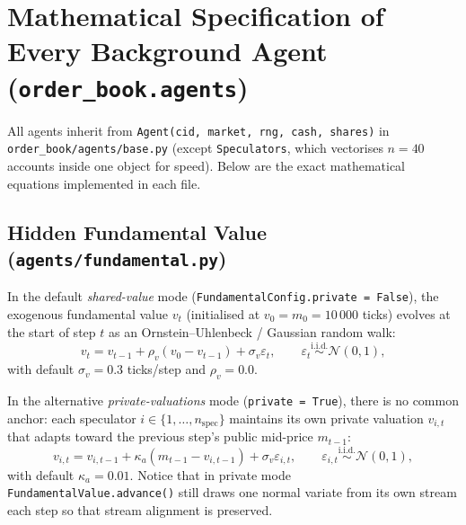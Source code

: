 \documentclass[11pt,a4paper]{article}
\newcommand{\code}[1]{\texttt{#1}}
\begin{document}
\section{Mathematical Specification of Every Background Agent (\code{order\_book.agents})}
\label{sec:agents}

All agents inherit from \code{Agent(cid, market, rng, cash, shares)} in \code{order\_book/agents/base.py}
(except \code{Speculators}, which vectorises $n=40$ accounts inside one object for speed). Below are the
exact mathematical equations implemented in each file.

\subsection{Hidden Fundamental Value (\code{agents/fundamental.py})}
\label{sec:fundamental}

In the default \emph{shared-value} mode (\code{FundamentalConfig.private = False}), the exogenous
fundamental value $v_t$ (initialised at $v_0 = m_0 = 10\,000$ ticks) evolves at the start of step $t$ as
an Ornstein--Uhlenbeck / Gaussian random walk:
\begin{equation}
  v_t = v_{t-1} + \rho_v (v_0 - v_{t-1}) + \sigma_v \varepsilon_t,
  \qquad \varepsilon_t \stackrel{\text{i.i.d.}}{\sim} \mathcal{N}(0, 1),
\end{equation}
with default $\sigma_v = 0.3$ ticks/step and $\rho_v = 0.0$.

In the alternative \emph{private-valuations} mode (\code{private = True}), there is no common anchor:
each speculator $i \in \{1,\dots,n_{\text{spec}}\}$ maintains its own private valuation $v_{i,t}$ that
adapts toward the previous step's public mid-price $m_{t-1}$:
\begin{equation}
  v_{i,t} = v_{i,t-1} + \kappa_a (m_{t-1} - v_{i,t-1}) + \sigma_v \varepsilon_{i,t},
  \qquad \varepsilon_{i,t} \stackrel{\text{i.i.d.}}{\sim} \mathcal{N}(0, 1),
\end{equation}
with default $\kappa_a = 0.01$. Notice that in private mode \code{FundamentalValue.advance()} still draws
one normal variate from its own stream each step so that stream alignment is preserved.
\end{document}

